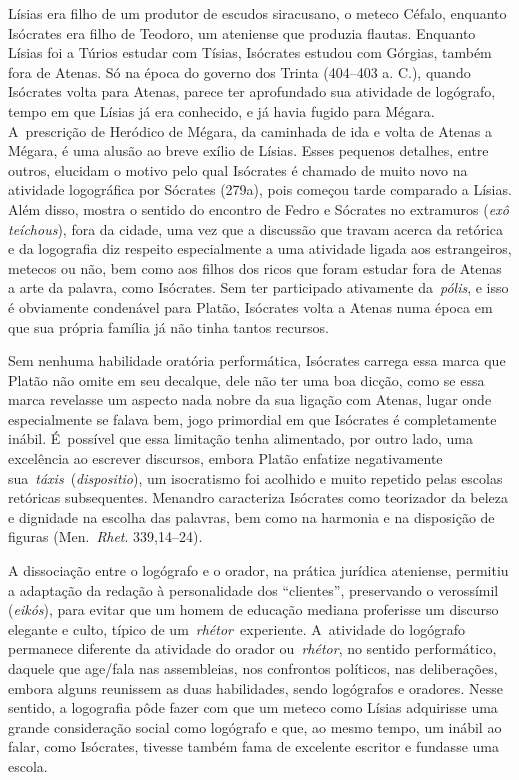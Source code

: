 Lísias era filho de um produtor de escudos siracusano, o meteco Céfalo,
enquanto Isócrates era filho de Teodoro, um ateniense que produzia
flautas. Enquanto Lísias foi a Túrios estudar com Tísias, Isócrates
estudou com Górgias, também fora de Atenas. Só na época do governo dos
Trinta (404--403 a. C.), quando Isócrates volta para Atenas, parece ter
aprofundado sua atividade de logógrafo, tempo em que Lísias já era
conhecido, e já havia fugido para Mégara. A~prescrição de Heródico de
Mégara, da caminhada de ida e volta de Atenas a Mégara, é uma alusão ao
breve exílio de Lísias. Esses pequenos detalhes, entre outros, elucidam
o motivo pelo qual Isócrates é chamado de muito novo na atividade
logográfica por Sócrates (279a), pois começou tarde comparado a Lísias.
Além disso, mostra o sentido do encontro de Fedro e Sócrates no
extramuros (\emph{exô teíchous}), fora da cidade, uma vez que a
discussão que travam acerca da retórica e da logografia diz respeito
especialmente a uma atividade ligada aos estrangeiros, metecos ou não,
bem como aos filhos dos ricos que foram estudar fora de Atenas a arte da
palavra, como Isócrates. Sem ter participado ativamente da~\emph{pólis},
e isso é obviamente condenável para Platão, Isócrates volta a Atenas
numa época em que sua própria família já não tinha tantos recursos.

Sem nenhuma habilidade oratória performática, Isócrates carrega essa
marca que Platão não omite em seu decalque, dele não ter uma boa dicção,
como se essa marca revelasse um aspecto nada nobre da sua ligação com
Atenas, lugar onde especialmente se falava bem, jogo primordial em que
Isócrates é completamente inábil. É~possível que essa limitação tenha
alimentado, por outro lado, uma excelência ao escrever discursos, embora
Platão enfatize negativamente sua~\emph{táxis}~(\emph{dispositio}), um
isocratismo foi acolhido e muito repetido pelas escolas retóricas
subsequentes. Menandro caracteriza Isócrates como teorizador da beleza e
dignidade na escolha das palavras, bem como na harmonia e na disposição
de figuras (Men.~\emph{Rhet}. 339,14--24).

A dissociação entre o logógrafo e o orador, na prática jurídica
ateniense, permitiu a adaptação da redação à personalidade dos
``clientes'', preservando o verossímil (\emph{eikós}), para evitar que
um homem de educação mediana proferisse um discurso elegante e culto,
típico de um~\emph{rhétor}~experiente. A~atividade do logógrafo
permanece diferente da atividade do orador ou~\emph{rhétor}, no sentido
performático, daquele que age/\allowbreak{}fala nas assembleias, nos confrontos
políticos, nas deliberações, embora alguns reunissem as duas
habilidades, sendo logógrafos e oradores. Nesse sentido, a logografia
pôde fazer com que um meteco como Lísias adquirisse uma grande
consideração social como logógrafo e que, ao mesmo tempo, um inábil ao
falar, como Isócrates, tivesse também fama de excelente escritor e
fundasse uma escola.

